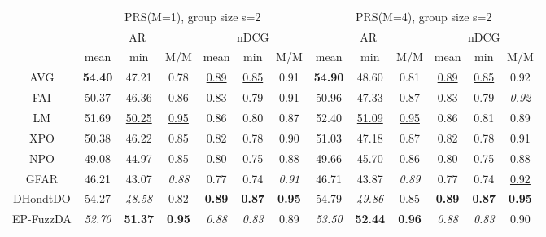 \begin{tabular}{ c | c c c | c c c || c c c | c c c}

\multicolumn{1}{c}{} & \multicolumn{6}{c}{PRS(M=1), group size s=2} & \multicolumn{6}{c}{PRS(M=4), group size s=2} \\
\multicolumn{1}{c}{} & \multicolumn{3}{c}{AR} & \multicolumn{3}{c}{nDCG} & \multicolumn{3}{c}{AR} & \multicolumn{3}{c}{nDCG} \\
& mean & min & M/M & mean & min & M/M & mean & min & M/M & mean & min & M/M \\
\hline
AVG & \textbf{54.40} & 47.21 & 0.78 & \underline{0.89} & \underline{0.85} & 0.91 & \textbf{54.90} & 48.60 & 0.81 & \underline{0.89} & \underline{0.85} & 0.92 \\
FAI & 50.37 & 46.36 & 0.86 & 0.83 & 0.79 & \underline{0.91} & 50.96 & 47.33 & 0.87 & 0.83 & 0.79 & \textit{0.92} \\
LM & 51.69 & \underline{50.25} & \underline{0.95} & 0.86 & 0.80 & 0.87 & 52.40 & \underline{51.09} & \underline{0.95} & 0.86 & 0.81 & 0.89 \\
XPO & 50.38 & 46.22 & 0.85 & 0.82 & 0.78 & 0.90 & 51.03 & 47.18 & 0.87 & 0.82 & 0.78 & 0.91 \\
NPO & 49.08 & 44.97 & 0.85 & 0.80 & 0.75 & 0.88 & 49.66 & 45.70 & 0.86 & 0.80 & 0.75 & 0.88 \\
GFAR & 46.21 & 43.07 & \textit{0.88} & 0.77 & 0.74 & \textit{0.91} & 46.71 & 43.87 & \textit{0.89} & 0.77 & 0.74 & \underline{0.92} \\
DHondtDO & \underline{54.27} & \textit{48.58} & 0.82 & \textbf{0.89} & \textbf{0.87} & \textbf{0.95} & \underline{54.79} & \textit{49.86} & 0.85 & \textbf{0.89} & \textbf{0.87} & \textbf{0.95} \\
EP-FuzzDA & \textit{52.70} & \textbf{51.37} & \textbf{0.95} & \textit{0.88} & \textit{0.83} & 0.89 & \textit{53.50} & \textbf{52.44} & \textbf{0.96} & \textit{0.88} & \textit{0.83} & 0.90 \\


\end{tabular}
